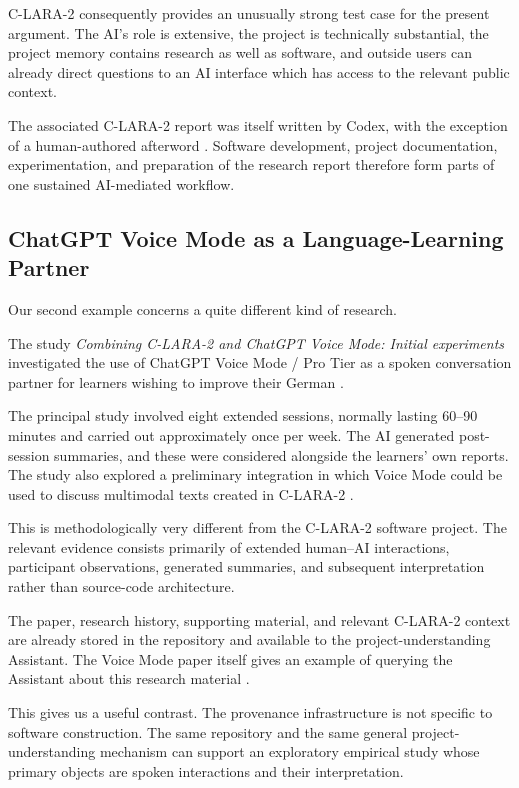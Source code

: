 C-LARA-2 consequently provides an unusually strong test case for the present argument. The AI's role is extensive, the project is technically substantial, the project memory contains research as well as software, and outside users can already direct questions to an AI interface which has access to the relevant public context.

The associated C-LARA-2 report was itself written by Codex, with the exception of a human-authored afterword \citep{bediEtAl2026clara2}. Software development, project documentation, experimentation, and preparation of the research report therefore form parts of one sustained AI-mediated workflow.


\subsection{ChatGPT Voice Mode as a Language-Learning Partner}

Our second example concerns a quite different kind of research.

The study \emph{Combining C-LARA-2 and ChatGPT Voice Mode: Initial experiments} investigated the use of ChatGPT Voice Mode / Pro Tier as a spoken conversation partner for learners wishing to improve their German \citep{wrightEtAl2026voice}.

The principal study involved eight extended sessions, normally lasting 60--90 minutes and carried out approximately once per week. The AI generated post-session summaries, and these were considered alongside the learners' own reports. The study also explored a preliminary integration in which Voice Mode could be used to discuss multimodal texts created in C-LARA-2 \citep{wrightEtAl2026voice}.

This is methodologically very different from the C-LARA-2 software project. The relevant evidence consists primarily of extended human--AI interactions, participant observations, generated summaries, and subsequent interpretation rather than source-code architecture.

The paper, research history, supporting material, and relevant C-LARA-2 context are already stored in the repository and available to the project-understanding Assistant. The Voice Mode paper itself gives an example of querying the Assistant about this research material \citep{wrightEtAl2026voice}.

This gives us a useful contrast. The provenance infrastructure is not specific to software construction. The same repository and the same general project-understanding mechanism can support an exploratory empirical study whose primary objects are spoken interactions and their interpretation.

